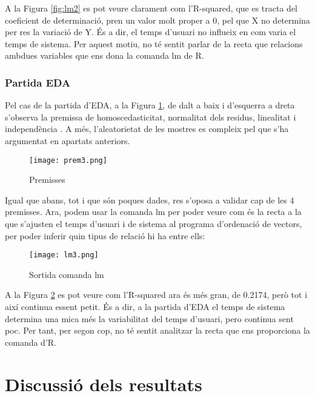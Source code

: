 \documentclass[12pt]{article}
\begin{document}
A la Figura \ref{fig:lm2} es pot veure clarament com l'R-squared, que es tracta del coeficient de determinació, pren un valor molt proper
a 0, pel que X no determina per res la variació de Y. És a dir, el temps d'usuari no influeix en com varia el temps de sistema. Per aquest
motiu, no té sentit parlar de la recta que relacions ambdues variables que ens dona la comanda lm de R.

\hfill \break
\subsubsection{Partida EDA}
Pel cas de la partida d'EDA, a la Figura \ref{fig:prem3}, de dalt a baix i d'esquerra a dreta s'observa la premissa
de homoscedasticitat, normalitat dels residus, linealitat i independència . A més, l'aleatorietat de les mostres es compleix pel que s'ha 
argumentat en apartats anteriors.

\begin{figure}[h!]
  \centering
  \texttt{[image: prem3.png]}
  \caption{Premisses}
  \label{fig:prem3}
\end{figure} 

Igual que abans, tot i que són poques dades, res s'oposa a validar cap de les 4 premisses.
\hfill \break
Ara, podem usar la comanda lm per poder veure com és la recta a la que s'ajusten el temps d'usuari i de sistema al programa d'ordenació
de vectors, per poder inferir quin tipus de relació hi ha entre ells:

\begin{figure}[h!]
  \centering
  \texttt{[image: lm3.png]}
  \caption{Sortida comanda lm}
  \label{fig:lm3}
\end{figure} 

A la Figura \ref{fig:lm3} es pot veure com l'R-squared ara és més gran, de 0.2174, però tot i així continua essent petit. És a dir, a la
partida d'EDA el temps de sistema determina una mica més la variabilitat del temps d'usuari, pero continua sent poc. Per tant, per segon cop,
no té sentit analitzar la recta que ens proporciona la comanda d'R.

\section{Discussió dels resultats}
\end{document}
